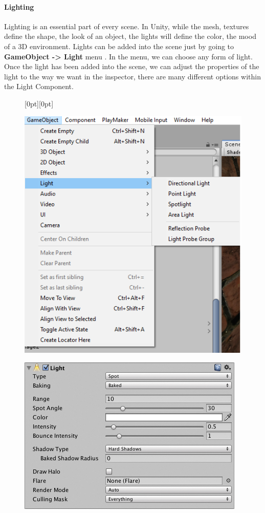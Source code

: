 \documentclass[a4paper, 13pt]{extarticle}
\begin{document}
{\paragraph{Lighting}
Lighting is an essential part of every scene. In Unity, while the mesh, textures define the shape, the look of an object, the lights will define the color, the mood of a 3D environment. Lights can be added into the scene just by going to {\bfseries GameObject -> Light} menu . In the menu, we can choose any form of light. Once the light has been added into the scene, we can adjust the properties of the light to the way we want in the inspector, there are many different options within the Light Component. 
\newpage
\begin{figure}[h]
	\centering
	\raisebox{-25mm}[0pt][0pt]{
		\begin{minipage}{.4\textwidth}
			\centering
			\includegraphics[width=0.8\linewidth]{intructions/choose_light.png}
			\centering
			\label{fig:test26}
		\end{minipage}
		\begin{minipage}{.45\textwidth}
			\centering
			\includegraphics[width=1.2\linewidth]{intructions/light_properties.png}

\end{minipage}}
\end{figure}}
\end{document}
